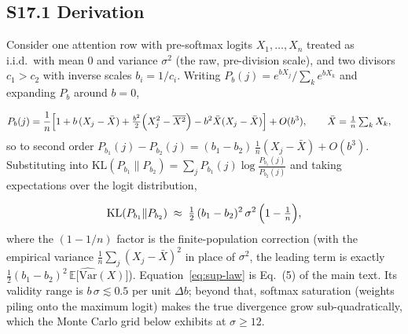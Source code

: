 \documentclass[10pt,a4paper]{article}
\begin{document}
\subsection*{S17.1 Derivation}
Consider one attention row with pre-softmax logits $X_1, \dots, X_n$ treated
as i.i.d.\ with mean 0 and variance $\sigma^2$ (the raw, pre-division scale),
and two divisors $c_1 > c_2$ with inverse scales $b_i = 1/c_i$. Writing
$P_b(j) = e^{b X_j}/\sum_k e^{b X_k}$ and expanding $P_b$ around $b = 0$,

\begin{align}
  P_b(j) &= \frac{1}{n}\Bigl[1 + b\,(X_j - \bar X)
           + \tfrac{b^2}{2}\Bigl(X_j^2 - \overline{X^2}\Bigr)
           - b^2 \bar X (X_j - \bar X)\Bigr] + O(b^3),
  \qquad \bar X = \tfrac{1}{n}\textstyle\sum_k X_k,
\end{align}
so to second order $P_{b_1}(j) - P_{b_2}(j)
= (b_1 - b_2)\,\tfrac{1}{n}(X_j - \bar X) + O(b^3)$. Substituting into
$\mathrm{KL}(P_{b_1}\|P_{b_2}) = \sum_j P_{b_1}(j)\log\frac{P_{b_1}(j)}{P_{b_2}(j)}$
and taking expectations over the logit distribution,

\begin{equation}
  \mathrm{KL}(P_{b_1}\|P_{b_2})
  \;\approx\; \tfrac{1}{2}\,(b_1 - b_2)^2\,\sigma^2\,\Bigl(1 - \tfrac{1}{n}\Bigr),
  \label{eq:sup-law}
\end{equation}
where the $(1 - 1/n)$ factor is the finite-population correction (with the
empirical variance $\tfrac{1}{n}\sum_j (X_j - \bar X)^2$ in place of
$\sigma^2$, the leading term is exactly
$\tfrac{1}{2}(b_1-b_2)^2\,\mathbb{E}\bigl[\widehat{\mathrm{Var}}(X)\bigr]$).
Equation~\eqref{eq:sup-law} is Eq.~(5) of the main text. Its validity range
is $b\,\sigma \lesssim 0.5$ per unit $\Delta b$; beyond that, softmax
saturation (weights piling onto the maximum logit) makes the true divergence
grow sub-quadratically, which the Monte Carlo grid below exhibits at
$\sigma \ge 12$.
\end{document}
